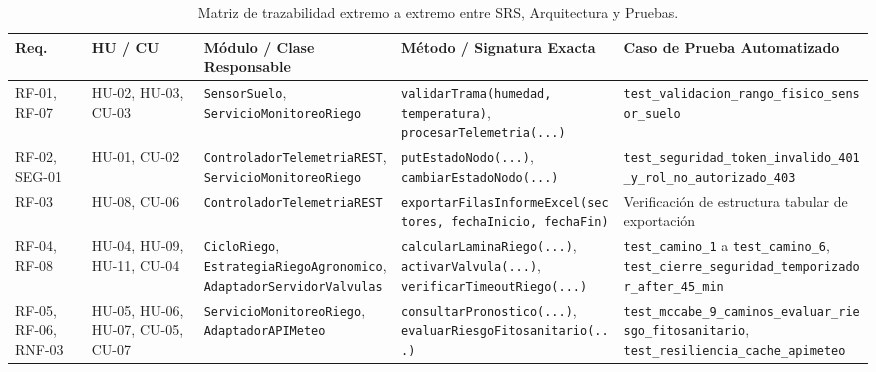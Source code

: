 \documentclass[12pt,letterpaper]{report}
\begin{document}
\begin{table}[H]
    \centering
    \footnotesize
    \renewcommand{\arraystretch}{1.3}
    \begin{tabularx}{\linewidth}{|L{1.6cm}|L{1.8cm}|L{4.2cm}|L{4.2cm}|Y|}
        \hline
        \textbf{Req.} & \textbf{HU / CU} & \textbf{Módulo / Clase Responsable} & \textbf{Método / Signatura Exacta} & \textbf{Caso de Prueba Automatizado} \\
        \hline
        RF-01, RF-07 & HU-02, HU-03, CU-03 & \texttt{SensorSuelo}, \texttt{ServicioMonitoreoRiego} & \texttt{validarTrama(humedad, temperatura)}, \texttt{procesarTelemetria(...)} & \texttt{test\_validacion\_rango\_fisico\_sensor\_suelo} \\
        \hline
        RF-02, SEG-01 & HU-01, CU-02 & \texttt{ControladorTelemetriaREST}, \texttt{ServicioMonitoreoRiego} & \texttt{putEstadoNodo(...)}, \texttt{cambiarEstadoNodo(...)} & \texttt{test\_seguridad\_token\_invalido\_401\_y\_rol\_no\_autorizado\_403} \\
        \hline
        RF-03 & HU-08, CU-06 & \texttt{ControladorTelemetriaREST} & \texttt{exportarFilasInformeExcel(sectores, fechaInicio, fechaFin)} & Verificación de estructura tabular de exportación \\
        \hline
        RF-04, RF-08 & HU-04, HU-09, HU-11, CU-04 & \texttt{CicloRiego}, \texttt{EstrategiaRiegoAgronomico}, \texttt{AdaptadorServidorValvulas} & \texttt{calcularLaminaRiego(...)}, \texttt{activarValvula(...)}, \texttt{verificarTimeoutRiego(...)} & \texttt{test\_camino\_1} a \texttt{test\_camino\_6}, \texttt{test\_cierre\_seguridad\_temporizador\_after\_45\_min} \\
        \hline
        RF-05, RF-06, RNF-03 & HU-05, HU-06, HU-07, CU-05, CU-07 & \texttt{ServicioMonitoreoRiego}, \texttt{AdaptadorAPIMeteo} & \texttt{consultarPronostico(...)}, \texttt{evaluarRiesgoFitosanitario(...)} & \texttt{test\_mccabe\_9\_caminos\_evaluar\_riesgo\_fitosanitario}, \texttt{test\_resiliencia\_cache\_apimeteo} \\
        \hline
    \end{tabularx}
    \caption{Matriz de trazabilidad extremo a extremo entre SRS, Arquitectura y Pruebas.}
    \label{tab:trazabilidad-diseno}
\end{table}

\newpage
\end{document}
